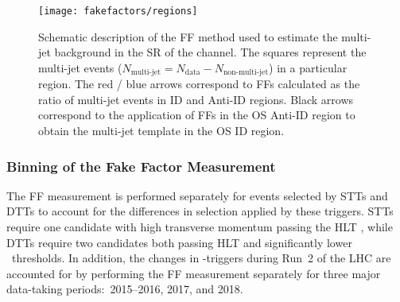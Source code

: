 \begin{figure}[htbp]
  \centering

  \texttt{[image: fakefactors/regions]}

  \caption[Schematic description of the FF method used to estimate the multi-jet
  background in the SR of the \hadhad channel.]{Schematic description of the FF
    method used to estimate the multi-jet background in the SR of the \hadhad
    channel. The squares represent the multi-jet events
    ($N_\text{multi-jet} = N_\text{data} - N_\text{non-multi-jet}$) in a
    particular region. The red / blue arrows correspond to FFs calculated as the
    ratio of multi-jet events in ID and Anti-ID regions. Black arrows correspond
    to the application of FFs in the OS Anti-ID region to obtain the multi-jet
    template in the OS ID region.}
  \label{fig:fakefactor_regions}
\end{figure}



\subsubsection{Binning of the Fake Factor Measurement}

The FF measurement is performed separately for events selected by STTs and DTTs
to account for the differences in selection applied by these triggers. STTs
require one \tauhadvis candidate with high transverse momentum passing the HLT
\tauid, while DTTs require two \tauhadvis candidates both passing HLT \tauid and
significantly lower \pT~thresholds. In addition, the changes in
\tauhadvis-triggers during Run~2 of the LHC are accounted for by performing the
FF measurement separately for three major data-taking periods:~2015--2016, 2017,
and 2018.

%

